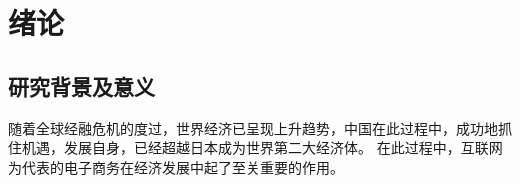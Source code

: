 \chapter{绪论}
\section{研究背景及意义}
随着全球经融危机的度过，世界经济已呈现上升趋势，中国在此过程中，成功地抓住机遇，发展自身，已经超越日本成为世界第二大经济体。
在此过程中，互联网为代表的电子商务在经济发展中起了至关重要的作用。

%
%
%
%
